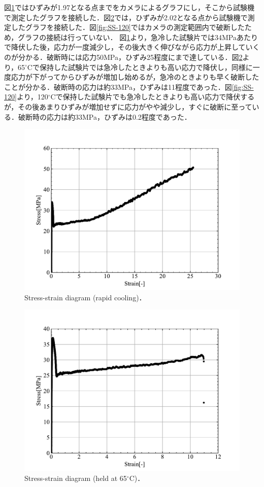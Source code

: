 図\ref{fig:SS-rapid}ではひずみが1.97となる点までをカメラによるグラフにし，そこから試験機で測定したグラフを接続した．図\ref{fig:SS-65}では，ひずみが2.02となる点から試験機で測定したグラフを接続した．図\ref{fig:SS-120}ではカメラの測定範囲内で破断したため，グラフの接続は行っていない．
図\ref{fig:SS-rapid}より，急冷した試験片では34MPaあたりで降伏した後，応力が一度減少し，その後大きく伸びながら応力が上昇していくのが分かる．破断時には応力50MPa，ひずみ25程度にまで達している．図\ref{fig:SS-65}より，65$^\circ$Cで保持した試験片では急冷したときよりも高い応力で降伏し，同様に一度応力が下がってからひずみが増加し始めるが，急冷のときよりも早く破断したことが分かる．破断時の応力は約33MPa，ひずみは11程度であった．図\ref{fig:SS-120}より，120$^\circ$Cで保持した試験片でも急冷したときよりも高い応力で降伏するが，その後あまりひずみが増加せずに応力がやや減少し，すぐに破断に至っている．破断時の応力は約33MPa，ひずみは0.2程度であった．
\begin{figure}
  \centering %
  \includegraphics[width=100truemm,clip]{fig/fig_SS-rapid.pdf}
  \caption{Stress-strain diagram (rapid cooling)．}
  \label{fig:SS-rapid}
\end{figure}
\begin{figure}[htbp]
  \centering %
  \includegraphics[width=100truemm,clip]{fig/fig_SS-65.pdf}
  \caption{Stress-strain diagram (held at 65$^\circ$C)．}
  \label{fig:SS-65}
\end{figure}
